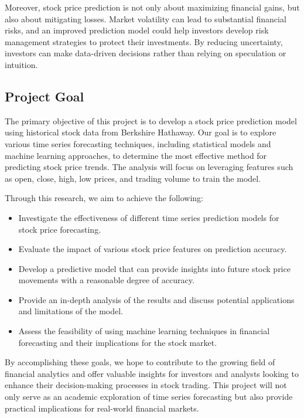\documentclass[conference]{IEEEtran}
\begin{document}
Moreover, stock price prediction is not only about maximizing financial gains, but also about mitigating losses. Market volatility can lead to substantial financial risks, and an improved prediction model could help investors develop risk management strategies to protect their investments. By reducing uncertainty, investors can make data-driven decisions rather than relying on speculation or intuition.

\subsection{Project Goal}
The primary objective of this project is to develop a stock price prediction model using historical stock data from Berkshire Hathaway. Our goal is to explore various time series forecasting techniques, including statistical models and machine learning approaches, to determine the most effective method for predicting stock price trends. The analysis will focus on leveraging features such as open, close, high, low prices, and trading volume to train the model.

Through this research, we aim to achieve the following:
\begin{itemize}
\item Investigate the effectiveness of different time series prediction models for stock price forecasting.

\item Evaluate the impact of various stock price features on prediction accuracy.

\item Develop a predictive model that can provide insights into future stock price movements with a reasonable degree of accuracy.

\item Provide an in-depth analysis of the results and discuss potential applications and limitations of the model.

\item Assess the feasibility of using machine learning techniques in financial forecasting and their implications for the stock market.
\end{itemize}

By accomplishing these goals, we hope to contribute to the growing field of financial analytics and offer valuable insights for investors and analysts looking to enhance their decision-making processes in stock trading. This project will not only serve as an academic exploration of time series forecasting but also provide practical implications for real-world financial markets.
\end{document}
